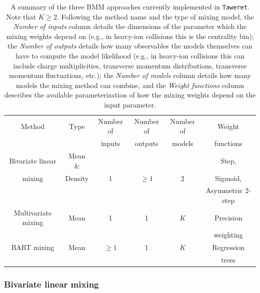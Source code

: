 \documentclass[10pt, preprint,aps,prc,floatfix,
tightenlines,
nofootinbib,superscriptaddress]{revtex4-2}
\begin{document}
\begin{table}
    \scriptsize
    \centering
    \begin{tabular}{c|c|c|c|c|c}
    \hline 
    \hline
       Method  & Type & Number of & Number of & Number of & Weight \\
         & & inputs & outputs & models & functions \\
       \hline
       Bivariate linear & Mean \& & &  & & Step,\\
      mixing & Density & 1 & $\geq 1$ & 2 & Sigmoid, \\
       & & & & & Asymmetric 2-step \\
       \hline
       Multivariate mixing & Mean & 1 & 1 & $K$ & Precision \\
       & & & & & weighting\\
       \hline 
       BART mixing & Mean & $\geq 1$ & 1 & $K$ & Regression \\
        & & & & & trees\\
    \hline 
    \hline
    \end{tabular}
    \caption{A summary of the three BMM approaches currently implemented in \texttt{Taweret}. Note that $K\geq 2$. Following the method name and the type of mixing model, the \textit{Number of inputs} column details the dimensions of the parameter which the mixing weights depend on (e.g., in heavy-ion collisions this is the centrality bin); the \textit{Number of outputs} details how many observables the models themselves can have to compute the model likelihood (e.g., in heavy-ion collisions this can include charge multiplicities, transverse momentum distributions, transverse momentum fluctuations, etc.); the \textit{Number of models} column details how many models the mixing method can combine, and the \textit{Weight functions} column describes the available parameterization of how the mixing weights depend on the input parameter.}
    \label{tab:methodcomparison}
\end{table}

\subsubsection{Bivariate linear mixing}
\end{document}
